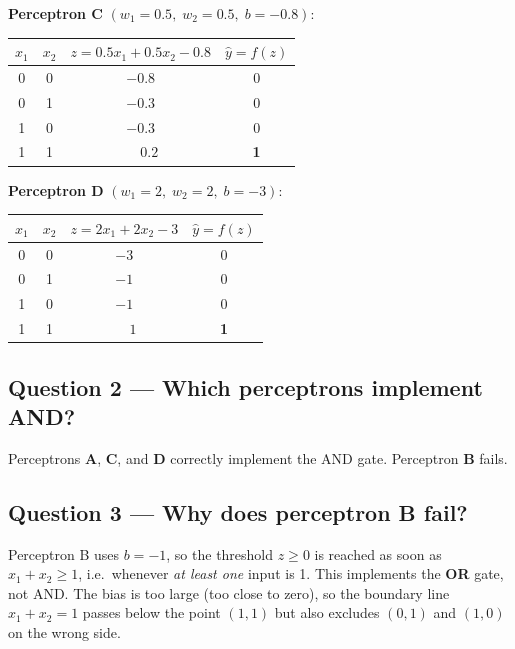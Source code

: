 \documentclass[11pt, a4paper]{article}
\begin{document}
\textbf{Perceptron C} $(w_1=0.5,\; w_2=0.5,\; b=-0.8)$:

\begin{center}
\renewcommand{\arraystretch}{1.4}
\begin{tabular}{cc|cc}
\toprule
$x_1$ & $x_2$ & $z = 0.5x_1 + 0.5x_2 - 0.8$ & $\hat{y} = f(z)$ \\
\midrule
0 & 0 & $-0.8$ & 0 \\
0 & 1 & $-0.3$ & 0 \\
1 & 0 & $-0.3$ & 0 \\
1 & 1 & $\phantom{-}0.2$ & \textbf{1} \\
\bottomrule
\end{tabular}
\end{center}

\textbf{Perceptron D} $(w_1=2,\; w_2=2,\; b=-3)$:

\begin{center}
\renewcommand{\arraystretch}{1.4}
\begin{tabular}{cc|cc}
\toprule
$x_1$ & $x_2$ & $z = 2x_1 + 2x_2 - 3$ & $\hat{y} = f(z)$ \\
\midrule
0 & 0 & $-3$ & 0 \\
0 & 1 & $-1$ & 0 \\
1 & 0 & $-1$ & 0 \\
1 & 1 & $\phantom{-}1$ & \textbf{1} \\
\bottomrule
\end{tabular}
\end{center}

\subsection*{Question 2 — Which perceptrons implement AND?}

\begin{tcolorbox}[answerbox, title={Answer}]
Perceptrons \textbf{A}, \textbf{C}, and \textbf{D} correctly implement the AND gate.
Perceptron \textbf{B} fails.
\end{tcolorbox}

\subsection*{Question 3 — Why does perceptron B fail?}

\begin{tcolorbox}[solutionbox]
Perceptron B uses $b = -1$, so the threshold $z \geq 0$ is reached as soon as $x_1 + x_2 \geq 1$,
i.e.\ whenever \emph{at least one} input is 1. This implements the \textbf{OR} gate, not AND.
The bias is too large (too close to zero), so the boundary line $x_1 + x_2 = 1$ passes below the
point $(1,1)$ but also excludes $(0,1)$ and $(1,0)$ on the wrong side.
\end{tcolorbox}
\end{document}
